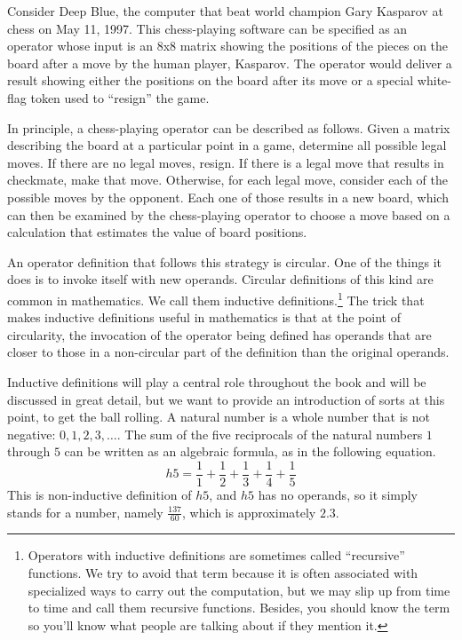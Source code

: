 Consider Deep Blue, the
computer that beat world champion Gary Kasparov at chess on May 11,
1997.  This chess-playing software can be specified as an operator whose input is
an 8x8 matrix showing the positions of the pieces
on the board after a move by the human player, Kasparov.
The operator would deliver a result showing
either the positions on the board after its move or a special
white-flag token used to ``resign'' the game.

In principle, a chess-playing operator can be described as follows.
Given a matrix describing the board at a particular point in a game,
determine all possible legal moves.  If there
are no legal moves, resign.  If there is a legal move that results
in checkmate, make that move.  Otherwise, for each legal move, consider
each of the possible moves by the opponent.  Each one of those results
in a new board, which can then be examined by the chess-playing operator
to choose a move based on a calculation that estimates the value of
board positions.

An operator definition that follows this strategy is circular.
One of the things it does is to invoke itself with new operands.
Circular definitions of this kind are common in mathematics.
We call them inductive definitions.\footnote{Operators with
inductive definitions
are sometimes called ``recursive'' functions.
We try to avoid that term because it is
often associated with specialized ways to carry out the computation,
but we may slip up from time to time and call them recursive functions.
Besides, you should know the term so you'll know what people are
talking about if they mention it.}
The trick that makes inductive definitions useful in mathematics
is that at the point of circularity,
the invocation of the operator being defined
has operands that are closer to those in a non-circular part of the
definition than the original operands.

Inductive definitions
will play a central role throughout the book
and will be discussed in great detail, but we want to provide an
introduction of sorts at this point, to get the ball rolling.
A natural number is a whole number that is not negative: $0, 1, 2, 3, \dots$.
The sum of the five reciprocals of the
natural numbers $1$ through $5$
can be written as an algebraic formula, as in the following equation.
\begin{displaymath}
h5 = \frac{1}{1} + \frac{1}{2} + \frac{1}{3} + \frac{1}{4} + \frac{1}{5}
\end{displaymath}
This is non-inductive definition of $h5$,
and $h5$ has no operands, so it simply stands for a number,
namely $\frac{137}{60}$, which is approximately $2.3$.

